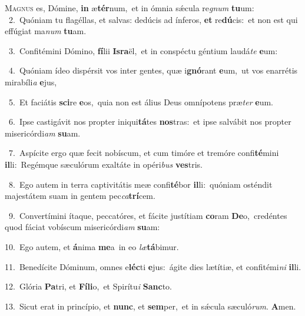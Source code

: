 \lettrine{\initial\textcolor{\initialcolor}{M}}{agnus} es, Dómine, \textbf{in} æ\-\textbf{tér}\-num,~\star et in ómnia sǽcula re\textit{gnum} \textbf{tu}\-um:\\
{\numbfont\textcolor{\numbcolor}{~2.}}~Quóniam tu flagéllas, et salvas: dedúcis ad ínferos, \textbf{et} re\-\textbf{dú}\-cis:~\star et non est qui effúgiat ma\textit{num} \textbf{tu}\-am.\par
{\numbfont\textcolor{\numbcolor}{~3.}}~Confitémini Dómino, \textbf{fí}\-lii \textbf{Is}\-\textbf{ra}ël,~\star et in conspéctu géntium laudá\textit{te} \textbf{e}\-um:\par
{\numbfont\textcolor{\numbcolor}{~4.}}~Quóniam ídeo dispérsit vos inter gentes, quæ i\-\textbf{gnó}\-rant \textbf{e}\-um,~\star ut vos enarrétis mirabíli\textit{a} \textbf{e}\-jus,\par
{\numbfont\textcolor{\numbcolor}{~5.}}~Et faciátis \textbf{sci}\-re \textbf{e}\-os,~\star quia non est álius Deus omnípotens præ\textit{ter} \textbf{e}\-um.\par
{\numbfont\textcolor{\numbcolor}{~6.}}~Ipse castigávit nos propter iniqui\-\textbf{tá}\-tes \textbf{nos}\-tras:~\star et ipse salvábit nos propter misericórdi\textit{am} \textbf{su}\-am.\par
{\numbfont\textcolor{\numbcolor}{~7.}}~Aspícite ergo quæ fecit nobíscum, et cum timóre et tremóre confi\-\textbf{té}\-mini \textbf{il}\-li:~\star Regémque sæculórum exaltáte in opéri\textit{bus} \textbf{ves}\-tris.\par
{\numbfont\textcolor{\numbcolor}{~8.}}~Ego autem in terra captivitátis meæ confi\-\textbf{té}\-bor \textbf{il}\-li:~\star quóniam osténdit majestátem suam in gentem pec\-\textit{ca}\-\textbf{trí}cem.\par
{\numbfont\textcolor{\numbcolor}{~9.}}~Convertímini ítaque, peccatóres, et fácite justítiam \textbf{co}\-ram \textbf{De}\-o,~\star credéntes quod fáciat vobíscum misericórdi\textit{am} \textbf{su}\-am:\par
{\numbfont\textcolor{\numbcolor}{10.}}~Ego autem, et \textbf{á}\-nima \textbf{me}\-a~\star in eo \textit{læ}\-\textbf{tá}bimur.\par
{\numbfont\textcolor{\numbcolor}{11.}}~Benedícite Dóminum, omnes e\-\textbf{léc}\-ti \textbf{e}\-jus:~\star ágite dies lætítiæ, et confitémi\textit{ni} \textbf{il}\-li.\par
{\numbfont\textcolor{\numbcolor}{12.}}~Glória \textbf{Pa}\-tri, et \textbf{Fí}\-\textbf{li}o,~\star et Spirítu\textit{i} \textbf{Sanc}\-to.\par
{\numbfont\textcolor{\numbcolor}{13.}}~Sicut erat in princípio, et \textbf{nunc}\-, et \textbf{sem}\-per,~\star et in sǽcula sæculó\-\textit{rum}\-. \textbf{A}\-men.\par
